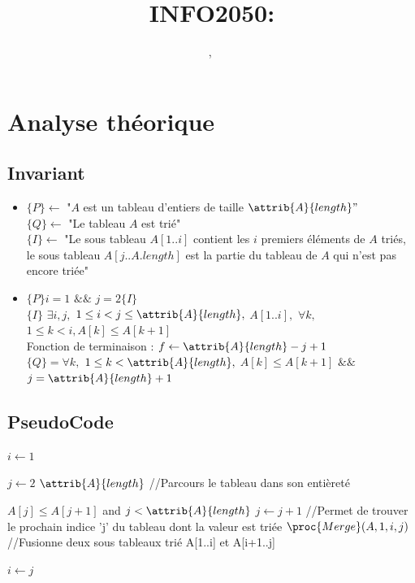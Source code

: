 \documentclass[a4paper, 11pt, oneside]{article}
\title{INFO2050: \intitule}
\author{\PrenomUN~\textsc{\NomUN}, \PrenomDEUX~\textsc{\NomDEUX}}
\date{}
\begin{document}
\maketitle
\newpage


	\section{Analyse théorique}
	\subsection{Invariant}
	\begin{itemize}[label=$\square$]

\item

	\noindent $\{P\} \gets$ "$A$ est un tableau d'entiers de taille $\attrib{A}{length}"$\\
	  $\{Q\} \gets$ "Le tableau $A$ est trié"\\ 
	$\{I\} \gets$ "Le sous tableau 
$A[1..i]$ contient les $i$ premiers éléments de $A$ triés, le sous tableau \indent \indent $A[j..A.length]$ est la partie du tableau de $A$ qui n'est pas encore triée"

\item $\{P\} i = 1$ $\&\&$ $j = 2 \{I\}$
\\ $\{I\}$  $\exists i,j,$ $1 \leq i < j \leq \attrib{A}{length},$  $A[1..i],$ $\forall k,$ $1 \leq k < i, A[k] \leq A[k+1]$ \\
\indent Fonction de terminaison : $f \gets \attrib{A}{length}-j +1$
\\ $\{Q\} = \forall k,$ $1 \leq k < \attrib{A}{length},$ $A[k] \leq A[k+1]$ $\&\&$ $j=\attrib{A}{length}+1$

\end{itemize}

	\subsection{PseudoCode}
	\label{PseudoCode}
	
	\begin{codebox}
\li $i \gets 1$

\li \For $j \gets 2$ \To $\attrib{A}{length}$ \color{Gray} //Parcours le tableau dans son entièreté
\Do

\li \While $A[j] \leq A[j+1]$ and $j < \attrib{A}{length}$
\li \Do
$j \gets j + 1$  \color{Gray} //Permet de trouver le prochain indice 'j' du tableau dont la valeur est triée
\End
\li $\proc{Merge}(A, 1, i, j)$  \color{Gray} //Fusionne deux sous tableaux trié A[1..i] et A[i+1..j]

\li $i \gets j$
\End
\end{codebox}
\end{document}
